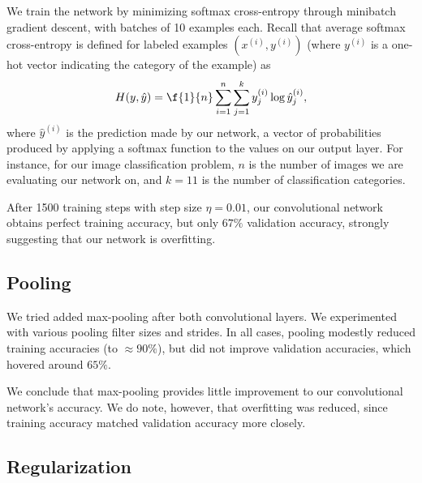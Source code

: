 \documentclass{article}
\newcommand{\sind}[1]{^{(#1)}}
\begin{document}
\begin{multicols}{2}
We train the network by minimizing softmax cross-entropy
through minibatch gradient descent,
with batches of 10 examples each.
Recall that average softmax cross-entropy is defined
for labeled examples $(x\sind{i}, y\sind{i})$
(where $y\sind{i}$ is a one-hot vector indicating the category of the example)
as
\begin{equation}
    H(y, \hat y) = \f{1}{n}\sum_{i=1}^n
                             \sum_{j=1}^k
                               y\sind{i}_j \log \hat y\sind{i}_j,
\end{equation}
where $\hat y\sind{i}$ is the prediction made by our network,
a vector of probabilities
produced by applying a softmax function
to the values on our output layer.
For instance, for our image classification problem,
$n$ is the number of images we are evaluating our network on,
and $k=11$ is the number of classification categories.

After 1500 training steps with step size $\eta = 0.01$,
our convolutional network obtains perfect training accuracy,
but only $67\%$ validation accuracy,
strongly suggesting that our network is overfitting.

\subsection{Pooling}

We tried added max-pooling
after both convolutional layers.
We experimented with various pooling filter sizes and strides.
In all cases,
pooling modestly reduced training accuracies
(to $\approx 90\%$),
but did not improve validation accuracies,
which hovered around $65\%$.

We conclude that max-pooling provides little improvement
to our convolutional network's accuracy.
We do note, however, that overfitting was reduced,
since training accuracy matched validation accuracy more closely.

\subsection{Regularization}


\end{multicols}
\end{document}
